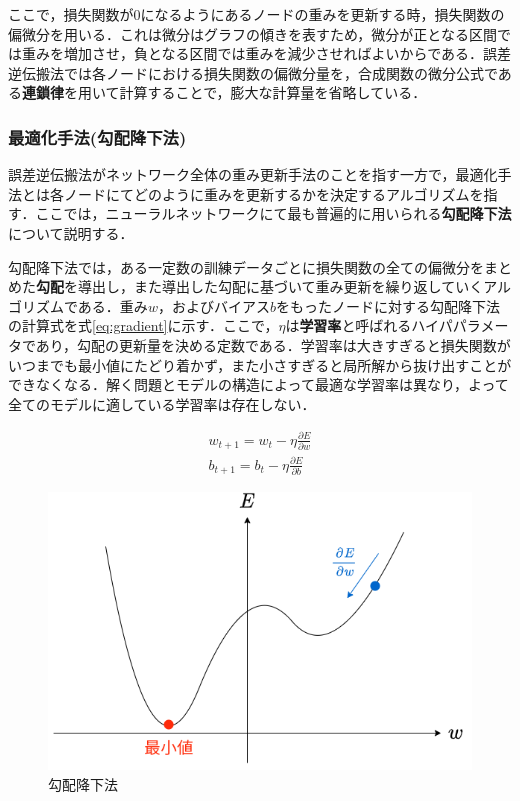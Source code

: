 \documentclass[a4j, 11pt]{jreport}
\begin{document}
ここで，損失関数が0になるようにあるノードの重みを更新する時，損失関数の偏微分を用いる．これは微分はグラフの傾きを表すため，微分が正となる区間では重みを増加させ，負となる区間では重みを減少させればよいからである．誤差逆伝搬法では各ノードにおける損失関数の偏微分量を，合成関数の微分公式である\textbf{連鎖律}を用いて計算することで，膨大な計算量を省略している．
\subsubsection{最適化手法(勾配降下法)}
誤差逆伝搬法がネットワーク全体の重み更新手法のことを指す一方で，最適化手法とは各ノードにてどのように重みを更新するかを決定するアルゴリズムを指す．ここでは，ニューラルネットワークにて最も普遍的に用いられる\textbf{勾配降下法}について説明する．

勾配降下法では，ある一定数の訓練データごとに損失関数の全ての偏微分をまとめた\textbf{勾配}を導出し，また導出した勾配に基づいて重み更新を繰り返していくアルゴリズムである．重み$w$，およびバイアス$b$をもったノードに対する勾配降下法の計算式を式\ref{eq:gradient}に示す．ここで，$\eta$は\textbf{学習率}と呼ばれるハイパパラメータであり，勾配の更新量を決める定数である．学習率は大きすぎると損失関数がいつまでも最小値にたどり着かず，また小さすぎると局所解から抜け出すことができなくなる．解く問題とモデルの構造によって最適な学習率は異なり，よって全てのモデルに適している学習率は存在しない．

\begin{equation}
  \begin{array}{l}
    w_{t+1} = w_t - \eta \frac{\partial E}{\partial w} \\
    b_{t+1} = b_t - \eta \frac{\partial E}{\partial b}
  \end{array}
  \label{eq:gradient}
\end{equation}

\begin{figure}[H]
 \centering
 \includegraphics[width=0.7\hsize, keepaspectratio]{images/drawio/gradient.png}
 \caption{勾配降下法}
 \label{fig:gradient}
\end{figure}
\end{document}
